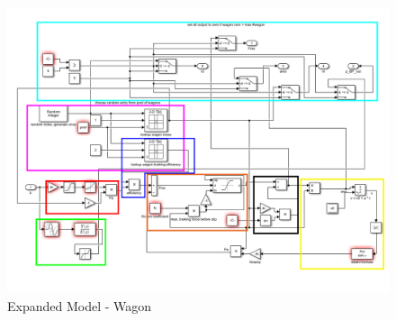 \begin{figure}[htb!]
	\centering
	\includegraphics[width=\linewidth]{./pic/expandedmodel_wagon}
	\caption{Expanded Model - Wagon}
	\label{fig:expandedmodel_wagon}
\end{figure}

